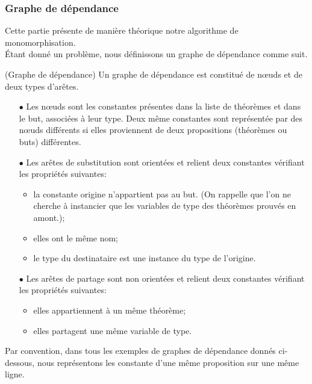 \subsubsection{Graphe de dépendance}
Cette partie présente de manière théorique notre algorithme de
monomorphisation.\\

Étant donné un problème, nous définissons un graphe de dépendance comme suit.
\begin{mydef} (Graphe de dépendance)
Un graphe de dépendance est constitué de nœuds et de deux types
d'arêtes.
\begin{enumerate}
\item[$\bullet$] Les nœuds sont les constantes présentes dans la liste
  de théorèmes et dans le but, associées à leur type. Deux même
  constantes sont représentée par des nœuds différents si elles
  proviennent de deux propositions (théorèmes ou buts) différentes.
\item[$\bullet$] Les arêtes de {\color{blue}substitution} sont orientées
  et relient deux
  constantes vérifiant les propriétés suivantes:
  \begin{itemize}
  \item la constante origine n'appartient pas au but. (On rappelle que
    l'on ne cherche à instancier que les variables de type des théorèmes
    prouvés en amont.);
  \item elles ont le même nom;
  \item le type du destinataire est une instance du type de l'origine.
  \end{itemize}
\item[$\bullet$] Les arêtes de {\color{green}partage} sont non
  orientées et relient deux constantes
  vérifiant les propriétés suivantes:
  \begin{itemize}
  \item elles appartiennent à un même théorème;
  \item elles partagent une même variable de type.
  \end{itemize}
\end{enumerate}
\end{mydef}

Par convention, dans tous les exemples de graphes de dépendance donnés
ci-dessous, nous représentons les constante d'une même proposition sur
une même ligne.

